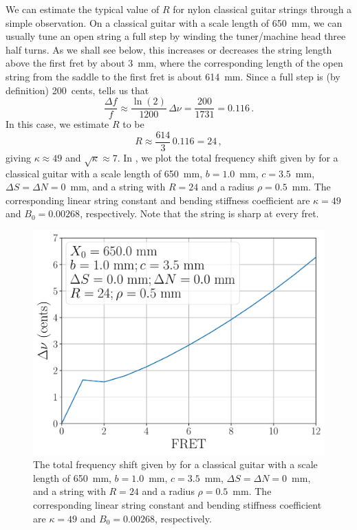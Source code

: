 We can estimate the typical value of $R$ for nylon classical guitar strings through a simple observation. On a classical guitar with a scale length of 650~mm, we can usually tune an open string a full step by winding the tuner/machine head three half turns. As we shall see below, this increases or decreases the string length above the first fret by about 3~mm, where the corresponding length of the open string from the saddle to the first fret is about 614~mm. Since a full step is (by definition) 200~cents,  tells us that
\begin{equation}
  \frac{\Delta f}{f} \approx \frac{\ln(2)}{1200}\, \Delta \nu = \frac{200}{1731} = 0.116\, .
\end{equation}
In this case, we estimate $R$ to be
\begin{equation}
  R \approx \frac{614}{3}\, 0.116 = 24\, ,
\end{equation}
giving $\kappa \approx 49$ and $\sqrt{\kappa} \approx 7$. In , we plot the total frequency shift given by  for a classical guitar with a scale length of 650~mm, $b = 1.0$~mm, $c = 3.5$~mm, $\Delta S = \Delta N = 0$~mm, and a string with $R = 24$ and a radius $\rho = 0.5$~mm. The corresponding linear string constant and bending stiffness coefficient are $\kappa = 49$ and $B_0 = 0.00268$, respectively. Note that the string is sharp at every fret.

\begin{figure}
  \centering
  \includegraphics[width=5.0in]{../figures/uncomp}
  \caption{\label{fig:uncomp} The total frequency shift given by  for a classical guitar with a scale length of 650~mm, $b = 1.0$~mm, $c = 3.5$~mm, $\Delta S = \Delta N = 0$~mm, and a string with $R = 24$ and a radius $\rho = 0.5$~mm. The corresponding linear string constant and bending stiffness coefficient are $\kappa = 49$ and $B_0 = 0.00268$, respectively.}
\end{figure}

